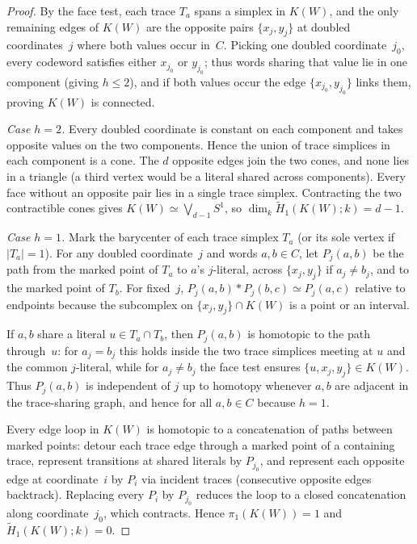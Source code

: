 \documentclass[11pt]{article}
\theoremstyle{plain}
\theoremstyle{definition}
\theoremstyle{remark}
\begin{document}
\begin{proof}
By the face test, each trace $T_a$ spans a simplex in $K(W)$, and the only remaining edges of $K(W)$ are the opposite pairs $\{x_j,y_j\}$ at doubled coordinates~$j$ where both values occur in~$C$. Picking one doubled coordinate~$j_0$, every codeword satisfies either $x_{j_0}$ or $y_{j_0}$; thus words sharing that value lie in one component (giving $h \le 2$), and if both values occur the edge $\{x_{j_0},y_{j_0}\}$ links them, proving $K(W)$ is connected.

\emph{Case $h = 2$.} Every doubled coordinate is constant on each component and takes opposite values on the two components. Hence the union of trace simplices in each component is a cone. The $d$ opposite edges join the two cones, and none lies in a triangle (a third vertex would be a literal shared across components). Every face without an opposite pair lies in a single trace simplex. Contracting the two contractible cones gives $K(W) \simeq \bigvee_{d-1} S^1$, so $\dim_k \widetilde{H}_1(K(W);k) = d - 1$.

\emph{Case $h = 1$.} Mark the barycenter of each trace simplex $T_a$ (or its sole vertex if $|T_a| = 1$). For any doubled coordinate~$j$ and words $a, b \in C$, let $P_j(a,b)$ be the path from the marked point of $T_a$ to $a$'s $j$-literal, across $\{x_j,y_j\}$ if $a_j \neq b_j$, and to the marked point of $T_b$. For fixed~$j$, $P_j(a,b) * P_j(b,c) \simeq P_j(a,c)$ relative to endpoints because the subcomplex on $\{x_j,y_j\} \cap K(W)$ is a point or an interval.

If $a, b$ share a literal $u \in T_a \cap T_b$, then $P_j(a,b)$ is homotopic to the path through~$u$: for $a_j = b_j$ this holds inside the two trace simplices meeting at $u$ and the common $j$-literal, while for $a_j \neq b_j$ the face test ensures $\{u,x_j,y_j\} \in K(W)$. Thus $P_j(a,b)$ is independent of $j$ up to homotopy whenever $a,b$ are adjacent in the trace-sharing graph, and hence for all $a,b \in C$ because $h = 1$.

Every edge loop in $K(W)$ is homotopic to a concatenation of paths between marked points: detour each trace edge through a marked point of a containing trace, represent transitions at shared literals by $P_{j_0}$, and represent each opposite edge at coordinate~$i$ by $P_i$ via incident traces (consecutive opposite edges backtrack). Replacing every $P_i$ by $P_{j_0}$ reduces the loop to a closed concatenation along coordinate~$j_0$, which contracts. Hence $\pi_1(K(W)) = 1$ and $\widetilde{H}_1(K(W);k) = 0$.
\end{proof}
\end{document}
